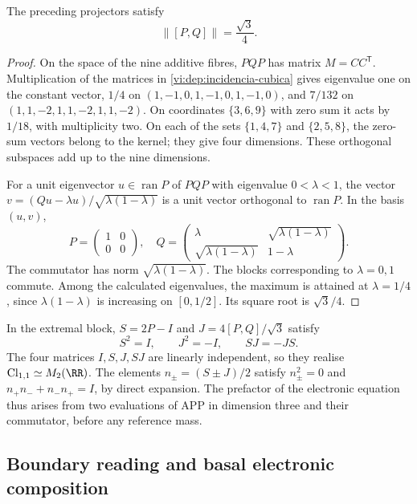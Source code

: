 \begin{proposition}
\label{vi:dep:norma-PQ}
The preceding projectors satisfy
\begin{equation}
 \|[P,Q]\|=\frac{\sqrt3}{4}.
 \label{vi:dep:prefactor-valor}
\end{equation}
\end{proposition}
\begin{proof}
On the space of the nine additive fibres, \(PQP\) has matrix
\(M=CC^{\mathsf T}\). Multiplication of the matrices in
\eqref{vi:dep:incidencia-cubica} gives eigenvalue one on the constant
vector, \(1/4\) on \((1,-1,0,1,-1,0,1,-1,0)\), and
\(7/132\) on \((1,1,-2,1,1,-2,1,1,-2)\).
On coordinates \(\{3,6,9\}\) with zero sum it acts by
\(1/18\), with multiplicity two. On each of the sets
\(\{1,4,7\}\) and \(\{2,5,8\}\), the zero-sum vectors
belong to the kernel; they give four dimensions. These orthogonal
subspaces add up to the nine dimensions.

For a unit eigenvector \(u\in\operatorname{ran}P\) of
\(PQP\) with eigenvalue \(0<\lambda<1\), the vector
\(v=(Qu-\lambda u)/\sqrt{\lambda(1-\lambda)}\) is a unit vector
orthogonal to \(\operatorname{ran}P\). In the basis \((u,v)\),
\[
 P=\begin{pmatrix}1&0\\0&0\end{pmatrix},\quad
 Q=\begin{pmatrix}\lambda&\sqrt{\lambda(1-\lambda)}\\
 \sqrt{\lambda(1-\lambda)}&1-\lambda\end{pmatrix}.
\]
The commutator has norm \(\sqrt{\lambda(1-\lambda)}\).
The blocks corresponding to \(\lambda=0,1\) commute. Among the
calculated eigenvalues, the maximum is attained at \(\lambda=1/4\),
since \(\lambda(1-\lambda)\) is increasing on \([0,1/2]\).
Its square root is \(\sqrt3/4\).
\end{proof}

In the extremal block, \(S=2P-I\) and
\(J=4[P,Q]/\sqrt3\) satisfy
\[
 S^2=I,\qquad J^2=-I,\qquad SJ=-JS.
\]
The four matrices \(I,S,J,SJ\) are linearly independent,
so they realise \(\mathrm{Cl}_{1,1}\simeq M_2(\RR)\).
The elements \(n_\pm=(S\pm J)/2\) satisfy
\(n_\pm^2=0\) and \(n_+n_-+n_-n_+=I\), by direct expansion.
The prefactor of the electronic equation thus arises from two evaluations
of APP in dimension three and their commutator, before any reference
mass.

\subsection{Boundary reading and basal electronic composition}
\label{vi:dep:basal}

